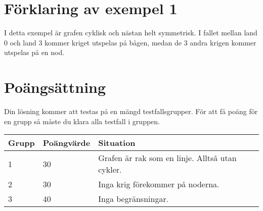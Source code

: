 \section*{Förklaring av exempel 1}

I detta exempel är grafen cyklisk och nästan helt symmetrisk. I fallet mellan
land 0 och land 3 kommer kriget utspelas på bågen, medan de 3 andra krigen
kommer utspelas på en nod.

\section*{Poängsättning}

Din lösning kommer att testas på en mängd testfallsgrupper. För att få poäng för en grupp
så måste du klara alla testfall i gruppen.

\begin{tabular}{| l | l | l | l |}
\hline
Grupp & Poängvärde & Situation \\ \hline
1     & 30         & Grafen är rak som en linje. Alltså utan cykler. \\ \hline
2     & 30         & Inga krig förekommer på noderna. \\ \hline
3     & 40         & Inga begränsningar. \\ \hline
\end{tabular}
